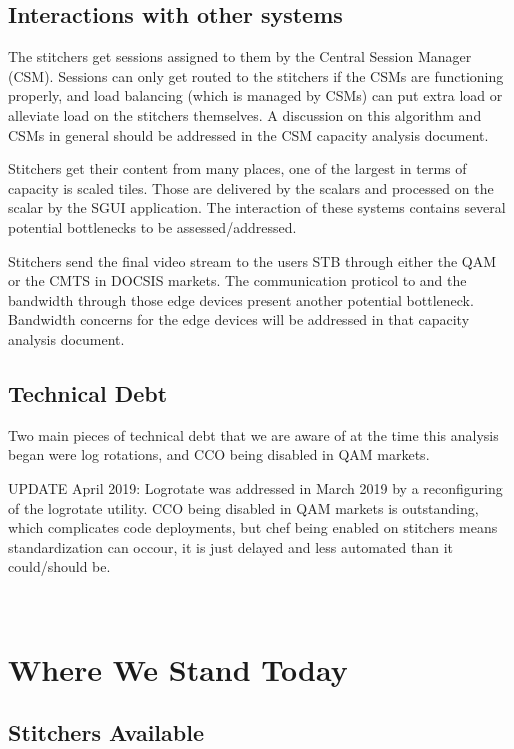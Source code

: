 \documentclass{article}
\begin{document}
\subsection{Interactions with other systems}
\label{SECTION-Interactions}

The stitchers get sessions assigned to them by the Central Session Manager (CSM). Sessions can only get routed to the stitchers if the CSMs are functioning properly, and load balancing (which is managed by CSMs) can put extra load or alleviate load on the stitchers themselves. A discussion on this algorithm and CSMs in general should be addressed in the CSM capacity analysis document. 

Stitchers get their content from many places, one of the largest in terms of capacity is scaled tiles. Those are delivered by the scalars and processed on the scalar by the SGUI application. The interaction of these systems contains several potential bottlenecks to be assessed/addressed. 

Stitchers send the final video stream to the users STB through either the QAM or the CMTS in DOCSIS markets. The communication proticol to and the bandwidth through those edge devices present another potential bottleneck. Bandwidth concerns for the edge devices will be addressed in that capacity analysis document. 

\subsection{Technical Debt}
\label{SECTION-TechDebt}

Two main pieces of technical debt that we are aware of at the time this analysis began were log rotations, and CCO being disabled in QAM markets. 

UPDATE April 2019: Logrotate was addressed in March 2019 by a reconfiguring of the logrotate utility. CCO being disabled in QAM markets is outstanding, which complicates code deployments, but chef being enabled on stitchers means standardization can occour, it is just delayed and less automated than it could/should be. 

​\section{Where We Stand Today}
\label{SECTION-Status}

\subsection{Stitchers Available}
\label{SECTION-StitchersAvailable}
\end{document}
